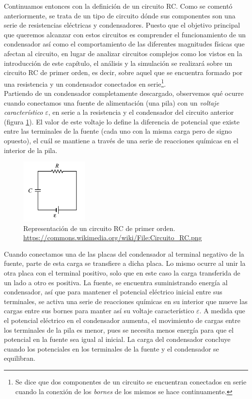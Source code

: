 \documentclass[../main.tex]{subfiles}
\begin{document}
Continuamos entonces con la definición de un circuito RC. Como se comentó anteriormente, se trata de un tipo de circuito dónde sus componentes son una serie de resistencias eléctricas y condensadores. Puesto que el objetivo principal que queremos alcanzar con estos circuitos es comprender el funcionamiento de un condensador así como el comportamiento de las diferentes magnitudes físicas que afectan al circuito, en lugar de analizar circuitos complejos como los vistos en la introducción de este capítulo, el análisis y la simulación se realizará sobre un circuito RC de primer orden, es decir, sobre aquel que se encuentra formado por una resistencia y un condensador conectados en serie\footnote{Se dice que dos componentes de un circuito se encuentran conectados en serie cuando la conexión de los \textit{bornes} de los mismos se hace continuamente. }.\\

Partiendo de un condensador completamente descargado, observemos qué ocurre cuando conectamos una fuente de alimentación (una pila) con un \textit{voltaje característico} $\varepsilon$, en serie a la resistencia y el condensador del circuito anterior (figura \ref{fig::circuito_rc_representación}). El valor de este voltaje lo define la diferencia de potencial que existe entre las terminales de la fuente (cada uno con la misma carga pero de signo opuesto), el cuál se mantiene a través de una serie de reacciones químicas en el interior de la pila.\\

\begin{figure}[!h]
          \centering
          \includegraphics[width=0.3\textwidth]{images/Circuito_RC.png}
          \caption{Representación de un circuito RC de primer orden. \url{https://commons.wikimedia.org/wiki/File:Circuito_RC.png}}
          \label{fig::circuito_rc_representación}
\end{figure}

Cuando conectamos una de las placas del condensador al terminal negativo de la fuente, parte de esta carga se transfiere a dicha placa. Lo mismo ocurre al unir la otra placa con el terminal positivo, solo que en este caso la carga transferida de un lado a otro es positiva. La fuente, se encuentra suministrando energía al condensador, así que para mantener el potencial eléctrico inicial entre sus terminales, se activa una serie de reacciones químicas en su interior que mueve las cargas entre sus bornes para manter así su voltaje característico $\varepsilon$. A medida que el potencial eléctrico en el condensador aumenta, el movimiento de cargas entre los terminales de la pila es menor, pues se necesita menos energía para que el potencial en la fuente sea igual al inicial. La carga del condensador concluye cuando los potenciales en los terminales de la fuente y el condensador se equilibran.
\end{document}
